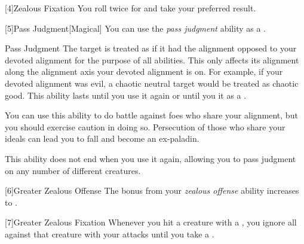         [4]{Zealous Fixation} You roll twice for  and take your preferred result.

        [5]{Pass Judgment}[Magical] You can use the \textit{pass judgment} ability as a .
        \begin{freeability}{Pass Judgment}
            The target is treated as if it had the alignment opposed to your devoted alignment for the purpose of all abilities.
            This only affects its alignment along the alignment axis your devoted alignment is on.
            For example, if your devoted alignment was evil, a chaotic neutral target would be treated as chaotic good.
            This ability lasts until you use it again or until you  it as a .

            You can use this ability to do battle against foes who share your alignment, but you should exercise caution in doing so.
            Persecution of those who share your ideals can lead you to fall and become an ex-paladin.

            \rankline
             This ability does not end when you use it again, allowing you to pass judgment on any number of different creatures.
        \end{freeability}

        [6]{Greater Zealous Offense} The bonus from your \textit{zealous offense} ability increases to .

        [7]{Greater Zealous Fixation} Whenever you hit a creature with a , you ignore all  against that creature with your attacks until you take a .


